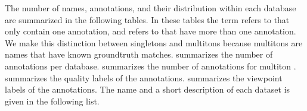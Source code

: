         \DatabaseInfo{}

        \timedist{}

        The number of names, annotations, and their distribution within each database are summarized in the
          following tables.
        In these tables the term  refers to \names{} that only contain one annotation, and
           refers to \names{} that have more than one annotation.
        We make this distinction between singletons and multitons because multitons are names that have known
          groundtruth matches.
         summarizes the number of annotations per database.
         summarizes the number of annotations for multiton \names{}.
         summarizes the quality labels of the annotations.
         summarizes the viewpoint labels of the annotations.
        The name and a short description of each dataset is given in the following list.

